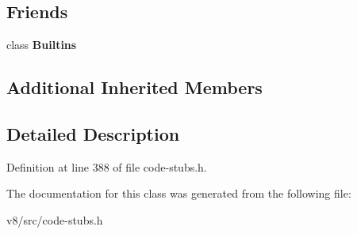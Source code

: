 \subsection*{Friends}
\begin{DoxyCompactItemize}
\item 
\mbox{\label{classv8_1_1internal_1_1CallApiCallbackStub_afb9273054bbf7171a46b35cebb4d4b34}} 
class {\bfseries Builtins}
\end{DoxyCompactItemize}
\subsection*{Additional Inherited Members}


\subsection{Detailed Description}


Definition at line 388 of file code-\/stubs.\+h.



The documentation for this class was generated from the following file\+:\begin{DoxyCompactItemize}
\item 
v8/src/code-\/stubs.\+h\end{DoxyCompactItemize}
